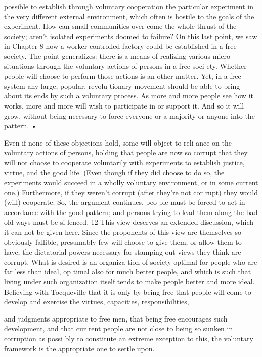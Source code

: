 \documentclass[11pt,openany]{book}
\begin{document}
possible to establish through voluntary cooperation the particular experiment in the very different external environment, which often is hostile to the goals of the experiment. How can small communities over come the whole thrust of the society; aren't isolated experiments doomed to failure? On this last point, we saw in Chapter 8 how a worker-controlled factory could be established in a free society. The point generalizes: there is a means of realizing various micro-situations through the voluntary actions of persons in a free soci ety. Whether people will choose to perform those actions is an other matter. Yet, in a free system any large, popular, revolu tionary movement should be able to bring about its ends by such a voluntary process. As more and more people see how it works, more and more will wish to participate in or support it. And so it will grow, without being necessary to force everyone or a majority or anyone into the pattern. • 

Even if none of these objections hold, some will object to reli ance on the voluntary actions of persons, holding that people are now so corrupt that they will not choose to cooperate voluntarily with experiments to establish justice, virtue, and the good life. (Even though if they did choose to do so, the experiments would succeed in a wholly voluntary environment, or in some current one.) Furthermore, if they weren't corrupt (after they're not cor rupt) they would (will) cooperate. So, the argument continues, peo ple must be forced to act in accordance with the good pattern; and persons trying to lead them along the bad old ways must be si lenced. 12 This view deserves an extended discussion, which it can not be given here. Since the proponents of this view are themselves so obviously fallible, presumably few will choose to give them, or allow them to have, the dictatorial powers necessary for stamping out views they think are corrupt. What is desired is an organiza tion of society optimal for people who are far less than ideal, op timal also for much better people, and which is such that living under such organization itself tends to make people better and more ideal. Believing with Tocqueville that it is only by being free that people will come to develop and exercise the virtues, capacities, responsibilities, 

and judgments appropriate to free men, that being free encourages such development, and that cur rent people are not close to being so sunken in corruption as possi bly to constitute an extreme exception to this, the voluntary framework is the appropriate one to settle upon. 
\end{document}
